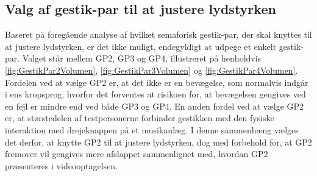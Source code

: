 \subsection{Valg af gestik-par til at justere lydstyrken}
\label{TestresultaterValgAfGestikkerValgVolumen}
%
Baseret på foregående analyse af hvilket semaforisk gestik-par, der skal knyttes til at justere lydstyrken, er det ikke muligt, endegyldigt at udpege et enkelt gestik-par. Valget står mellem GP2, GP3 og GP4, illustreret på henholdvis \autoref{fig:GestikPar2Volumen}, \autoref{fig:GestikPar3Volumen} og \autoref{fig:GestikPar4Volumen}. Fordelen ved at vælge GP2 er, at det ikke er en bevægelse, som normalvis indgår i ens kropsprog, hvorfor det forventes at risikoen for, at bevægelsen gengives ved en fejl er mindre end ved både GP3 og GP4. En anden fordel ved at vælge GP2 er, at størstedelen af testpersonerne forbinder gestikken med den fysiske interaktion med drejeknappen på et musikanlæg. I denne sammenhæng vælges det derfor, at knytte GP2 til at justere lydstyrken, dog med forbehold for, at GP2 fremover vil gengives mere afslappet sammenlignet med, hvordan GP2 præsenteres i videooptagelsen.    

